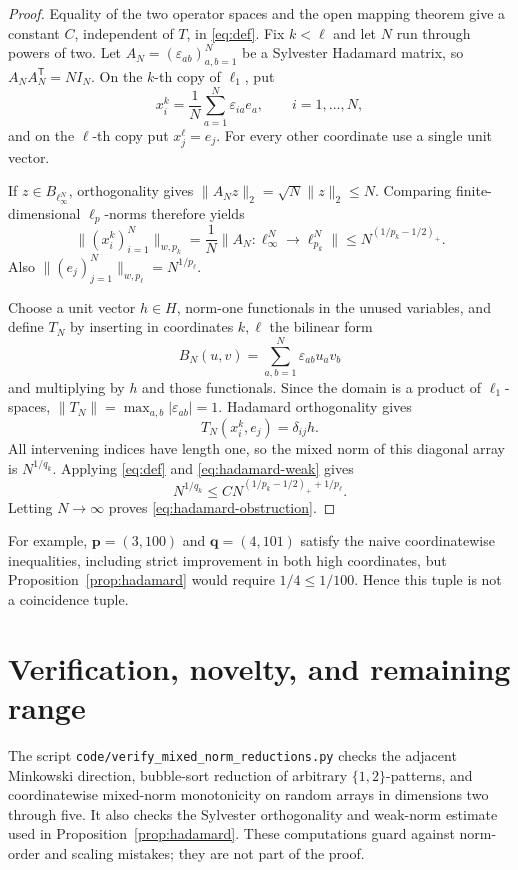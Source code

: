 \documentclass[11pt]{article}
\begin{document}
\begin{proof}
Equality of the two operator spaces and the open mapping theorem give a
constant \(C\), independent of \(T\), in \eqref{eq:def}.  Fix \(k<\ell\)
and let \(N\) run through powers of two.  Let
\(A_N=(\varepsilon_{ab})_{a,b=1}^N\) be a Sylvester Hadamard matrix, so
\(A_NA_N^{\mathsf T}=NI_N\).  On the \(k\)-th copy of \(\ell_1\), put
\[
 x_i^k=\frac1N\sum_{a=1}^N\varepsilon_{ia}e_a,
 \qquad i=1,\ldots,N,
\]
and on the \(\ell\)-th copy put \(x_j^\ell=e_j\).  For every other
coordinate use a single unit vector.

If \(z\in B_{\ell_\infty^N}\), orthogonality gives
\(\|A_Nz\|_2=\sqrt N\|z\|_2\le N\).  Comparing finite-dimensional
\(\ell_p\)-norms therefore yields
\begin{equation}\label{eq:hadamard-weak}
 \big\|(x_i^k)_{i=1}^N\big\|_{w,p_k}
 =\frac1N\|A_N:\ell_\infty^N\to\ell_{p_k}^N\|
 \le N^{(1/p_k-1/2)_+}.
\end{equation}
Also \(\|(e_j)_{j=1}^N\|_{w,p_\ell}=N^{1/p_\ell}\).

Choose a unit vector \(h\in H\), norm-one functionals in the unused
variables, and define \(T_N\) by inserting in coordinates \(k,\ell\) the
bilinear form
\[
 B_N(u,v)=\sum_{a,b=1}^N\varepsilon_{ab}u_av_b
\]
and multiplying by \(h\) and those functionals.  Since the domain is a
product of \(\ell_1\)-spaces, \(\|T_N\|=\max_{a,b}|\varepsilon_{ab}|=1\).
Hadamard orthogonality gives
\[
 T_N(x_i^k,e_j)=\delta_{ij}h.
\]
All intervening indices have length one, so the mixed norm of this diagonal
array is \(N^{1/q_k}\).  Applying \eqref{eq:def} and
\eqref{eq:hadamard-weak} gives
\[
 N^{1/q_k}\le C
 N^{(1/p_k-1/2)_++1/p_\ell}.
\]
Letting \(N\to\infty\) proves \eqref{eq:hadamard-obstruction}.
\end{proof}

For example, \(\mathbf p=(3,100)\) and \(\mathbf q=(4,101)\) satisfy the
naive coordinatewise inequalities, including strict improvement in both
high coordinates, but Proposition~\ref{prop:hadamard} would require
\(1/4\le1/100\).  Hence this tuple is not a coincidence tuple.

\section{Verification, novelty, and remaining range}

The script \texttt{code/verify\_mixed\_norm\_reductions.py} checks the
adjacent Minkowski direction, bubble-sort reduction of arbitrary
\(\{1,2\}\)-patterns, and coordinatewise mixed-norm monotonicity on random
arrays in dimensions two through five.  It also checks the Sylvester
orthogonality and weak-norm estimate used in Proposition~\ref{prop:hadamard}.
These computations guard against norm-order and scaling mistakes; they are
not part of the proof.
\end{document}
